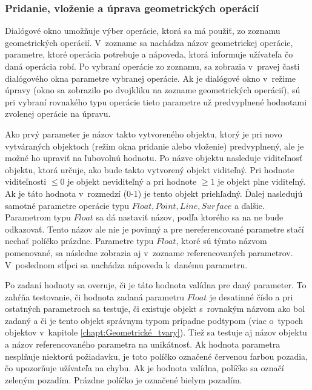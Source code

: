 

\subsubsection{Pridanie, vloženie a úprava geometrických operácií} 
Dialógové okno umožňuje výber operácie,  ktorá sa má použiť, zo zoznamu geometrických operácií. V~zozname sa nachádza názov geometrickej operácie, parametre, ktoré operácia potrebuje a nápoveda, ktorá informuje užívateľa čo daná operácia robí.
Po vybraní operácie zo zoznamu, sa zobrazia v~pravej časti dialógového okna parametre vybranej operácie. Ak je dialógové okno v~režime úpravy (okno sa zobrazilo po dvojkliku na zozname geometrických operácií), sú pri vybraní rovnakého typu operácie tieto parametre už predvyplnené hodnotami zvolenej operácie na úpravu.

Ako prvý parameter je názov takto vytvoreného objektu, ktorý je pri novo vytváraných objektoch (režim okna pridanie alebo vloženie) predvyplnený, ale je možné ho upraviť na ľubovolnú hodnotu.  
Po názve objektu nasleduje viditeľnosť objektu, ktorá určuje, ako bude takto vytvorený objekt viditeľný. Pri hodnote viditeľnosti $\leq0$ je objekt neviditeľný a pri hodnote $\geq1$ je objekt plne viditeľný. Ak je táto hodnota v~rozmedzí (0-1) je tento objekt priehľadný. 
Ďalej nasledujú samotné parametre operácie typu $Float,  Point, Line, Surface$ a ďalšie. Parametrom typu $Float$ sa dá nastaviť názov, podľa ktorého sa na ne bude odkazovať. Tento názov ale nie je povinný a pre nereferencované parametre stačí nechať políčko prázdne. Parametre typu $Float$, ktoré sú týmto názvom pomenované, sa následne zobrazia aj v~zozname referencovaných parametrov.
V~poslednom stĺpci sa nachádza nápoveda k~danému parametru.

Po zadaní hodnoty sa overuje, či je táto hodnota valídna pre daný parameter. To zahŕňa testovanie, či hodnota zadaná parametru $Float$ je desatinné číslo a pri ostatných parametroch sa testuje, či existuje objekt s~rovnakým názvom ako bol zadaný a či je tento objekt správnym typom prípadne podtypom (viac o~typoch objektov v~kapitole  \ref{chapt:Geometrické_tvary}). Tiež sa testuje aj názov objektu a názov referencovaného parametra na unikátnosť.
Ak hodnota parametra nesplňuje niektorú požiadavku, je toto políčko označené červenou farbou pozadia, čo upozorňuje užívateľa na chybu. Ak je hodnota valídna, políčko sa označí zeleným pozadím. Prázdne políčko je označené bielym pozadím. 

